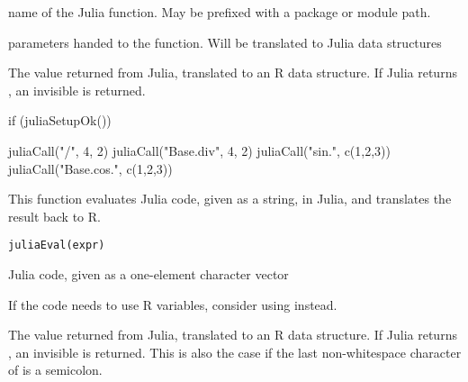 %
\begin{Arguments}
\begin{ldescription}
\item[\code{name}] name of the Julia function. May be prefixed with a package or module
path.

\item[\code{...}] parameters handed to the function. Will be translated
to Julia data structures
\end{ldescription}
\end{Arguments}
%
\begin{Value}
The value returned from Julia, translated to an R data structure.
If Julia returns , an invisible  is returned.
\end{Value}
%
\begin{Examples}
\begin{ExampleCode}
if (juliaSetupOk()) {

   juliaCall("/", 4, 2)
   juliaCall("Base.div", 4, 2)
   juliaCall("sin.", c(1,2,3))
   juliaCall("Base.cos.", c(1,2,3))

}


\end{ExampleCode}
\end{Examples}
%
\begin{Description}\relax
This function evaluates Julia code, given as a string, in Julia,
and translates the result back to R.
\end{Description}
%
\begin{Usage}
\begin{verbatim}
juliaEval(expr)
\end{verbatim}
\end{Usage}
%
\begin{Arguments}
\begin{ldescription}
\item[\code{expr}] Julia code, given as a one-element character vector
\end{ldescription}
\end{Arguments}
%
\begin{Details}\relax
If the code needs to use R variables, consider using 
instead.
\end{Details}
%
\begin{Value}
The value returned from Julia, translated to an R data structure.
If Julia returns , an invisible  is returned.
This is also the case if the last non-whitespace character of 
is a semicolon.
\end{Value}
